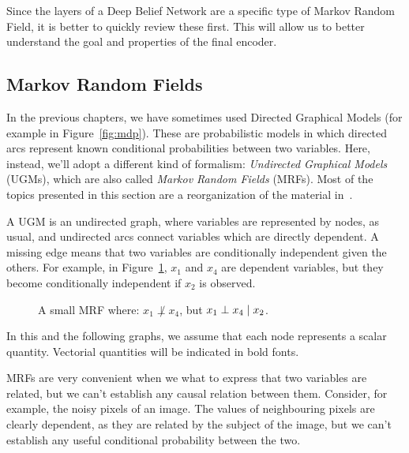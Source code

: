 Since the layers of a Deep Belief Network are a specific type of Markov Random
Field, it is better to quickly review these first. This will allow us to
better understand the goal and properties of the final encoder.


\subsection{Markov Random Fields}

In the previous chapters, we have sometimes used Directed Graphical Models
(for example in Figure~\vref{fig:mdp}). These are probabilistic models in
which directed arcs represent known conditional probabilities between two
variables. Here, instead, we'll adopt a different kind of formalism:
\emph{Undirected Graphical Models} (UGMs), which are also called \emph{Markov Random Fields}
(MRFs). Most of the topics presented
in this section are a reorganization of the material
in~\cite{bib:ml-book-murphy}.

A UGM is an undirected graph, where variables are represented by nodes, as
usual, and undirected arcs connect variables which are directly dependent.
A missing edge means that two variables are conditionally independent given
the others. For example, in Figure~\ref{fig:mrf}, $x_1$ and $x_4$ are
dependent variables, but they become conditionally independent if $x_2$ is
observed.
\begin{figure}
	\centering
	\caption{A small MRF where: $x_1 \not\perp x_4$, but $x_1 \perp x_4 \mid
	x_2$.}
	\label{fig:mrf}
\end{figure}
In this and the following graphs, we assume that each node represents a scalar
quantity. Vectorial quantities will be indicated in bold fonts.

MRFs are very convenient when we what to express that two variables are
related, but we can't establish any causal relation between them. Consider,
for example, the noisy pixels of an image. The values of neighbouring pixels
are clearly dependent, as they are related by the subject of the image, but we
can't establish any useful conditional probability between the two.

